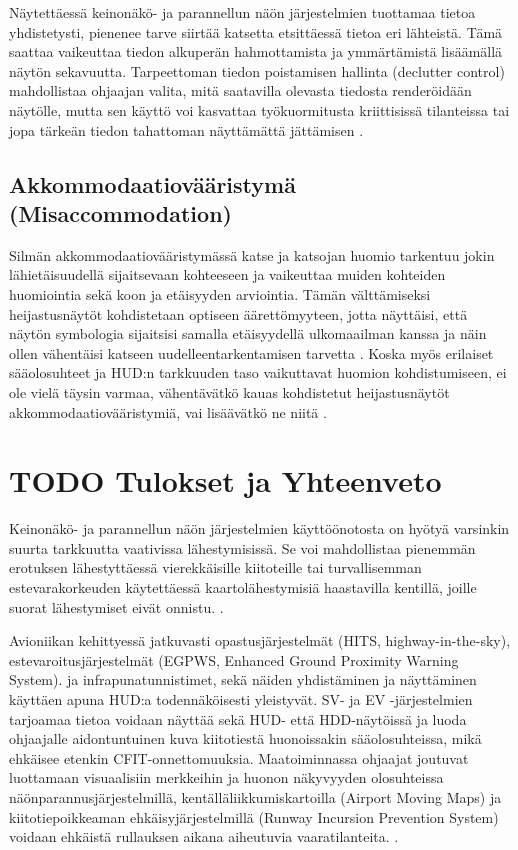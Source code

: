 \documentclass[utf8,bachelor,manualbib]{gradu3}
\begin{document}
Näytettäessä keinonäkö- ja parannellun näön järjestelmien tuottamaa tietoa yhdistetysti, pienenee tarve siirtää katsetta etsittäessä tietoa eri lähteistä. Tämä saattaa vaikeuttaa tiedon alkuperän hahmottamista ja ymmärtämistä lisäämällä näytön sekavuutta. Tarpeettoman tiedon poistamisen hallinta (declutter control) mahdollistaa ohjaajan valita, mitä saatavilla olevasta tiedosta renderöidään näytölle, mutta sen käyttö voi kasvattaa työkuormitusta kriittisissä tilanteissa tai jopa tärkeän tiedon tahattoman näyttämättä jättämisen \citep{baileyym2007}.

\section{Akkommodaatiovääristymä (Misaccommodation)}

Silmän akkommodaatiovääristymässä katse ja katsojan huomio tarkentuu jokin lähietäisuudellä sijaitsevaan kohteeseen ja vaikeuttaa muiden kohteiden huomiointia sekä koon ja etäisyyden arviointia. Tämän välttämiseksi heijastusnäytöt kohdistetaan optiseen äärettömyyteen, jotta näyttäisi, että näytön symbologia sijaitsisi samalla etäisyydellä ulkomaailman kanssa ja näin ollen vähentäisi katseen uudelleentarkentamisen tarvetta \citep{naish1964}. Koska myös erilaiset sääolosuhteet ja HUD:n tarkkuuden taso vaikuttavat huomion kohdistumiseen, ei ole vielä täysin varmaa, vähentävätkö kauas kohdistetut heijastusnäytöt akkommodaatiovääristymiä, vai lisäävätkö ne niitä \citep{crawfordneal2006}.

\chapter{TODO Tulokset ja Yhteenveto}

Keinonäkö- ja parannellun näön järjestelmien käyttöönotosta on hyötyä varsinkin suurta tarkkuutta vaativissa lähestymisissä. Se voi mahdollistaa pienemmän erotuksen lähestyttäessä vierekkäisille kiitoteille tai turvallisemman estevarakorkeuden käytettäessä kaartolähestymisiä haastavilla kentillä, joille suorat lähestymiset eivät onnistu. \citep{schnellym2004}.

Avioniikan kehittyessä jatkuvasti opastusjärjestelmät (HITS, highway-in-the-sky), estevaroitusjärjestelmät (EGPWS, Enhanced Ground Proximity Warning System). ja infrapunatunnistimet, sekä näiden yhdistäminen ja näyttäminen käyttäen apuna HUD:a todennäköisesti yleistyvät. SV- ja EV -järjestelmien tarjoamaa tietoa voidaan näyttää sekä HUD- että HDD-näytöissä ja luoda ohjaajalle aidontuntuinen kuva kiitotiestä huonoissakin sääolosuhteissa, mikä ehkäisee etenkin CFIT-onnettomuuksia. Maatoiminnassa ohjaajat joutuvat luottamaan visuaalisiin merkkeihin ja huonon näkyvyyden olosuhteissa näönparannusjärjestelmillä, kentälläliikkumiskartoilla (Airport Moving Maps) ja kiitotiepoikkeaman ehkäisyjärjestelmillä (Runway Incursion Prevention System) voidaan ehkäistä rullauksen aikana aiheutuvia vaaratilanteita. \citep{crawfordneal2006}.
\end{document}
